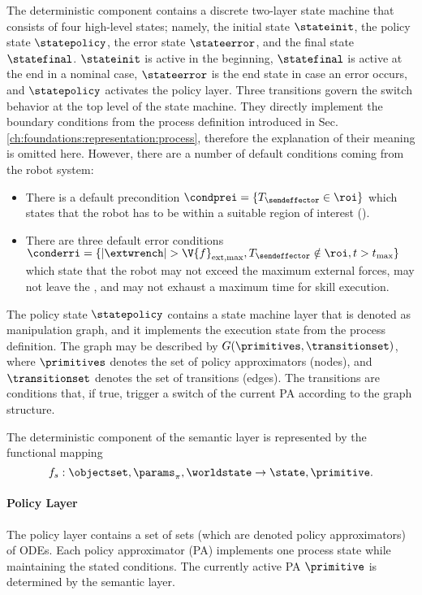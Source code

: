 The deterministic component contains a discrete two-layer state machine that consists of four high-level states; namely, the initial state $\stateinit$, the policy state $\statepolicy$, the error state $\stateerror$, and the final state $\statefinal$.
$\stateinit$ is active in the beginning, $\statefinal$ is active at the end in a nominal case, $\stateerror$ is the end state in case an error occurs, and $\statepolicy$ activates the policy layer.
Three transitions govern the switch behavior at the top level of the state machine.
They directly implement the boundary conditions from the process definition introduced in Sec. \ref{ch:foundations:representation:process}, therefore the explanation of their meaning is omitted here.
However, there are a number of default conditions coming from the robot system:
\begin{itemize}
\item There is a default precondition $\condprei=\{T_\sendeffector \in \roi \}$ which states that the robot has to be within a suitable region of interest (\roi{}).
\item There are three default error conditions $\conderri=\{|\extwrench| > \V{f}_\text{ext,max},T_\sendeffector \notin \roi, t>t_\text{max} \}$ which state that the robot may not exceed the maximum external forces, may not leave the \roi, and may not exhaust a maximum time for skill execution.
\end{itemize}

The policy state $\statepolicy$ contains a state machine layer that is denoted as manipulation graph, and it implements the execution state from the process definition.
The graph may be described by $G(\primitives,\transitionset)$, where $\primitives$ denotes the set of policy approximators (nodes), and $\transitionset$ denotes the set of transitions (edges).
The transitions are conditions that, if true, trigger a switch of the current PA according to the graph structure.

The deterministic component of the semantic layer is represented by the functional mapping
\begin{equation}
f_s: \objectset,\params_\pi,\worldstate \rightarrow \state,\primitive.
\end{equation}

\paragraph{Policy Layer}
The policy layer contains a set of sets (which are denoted policy approximators) of ODEs.
Each policy approximator (PA) implements one process state while maintaining the stated conditions.
The currently active PA $\primitive$ is determined by the semantic layer.
 
